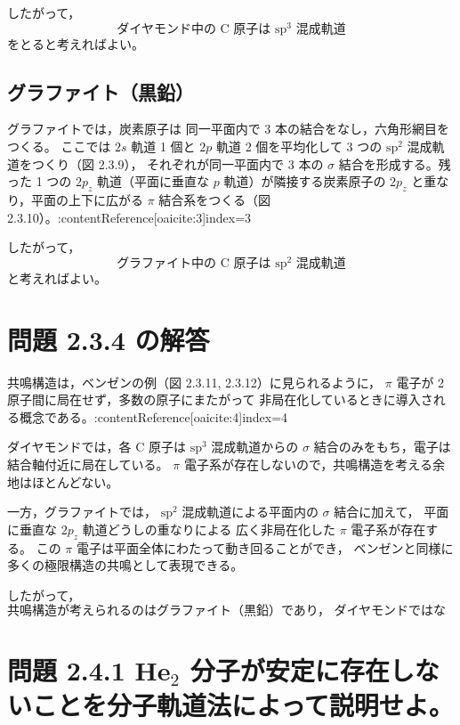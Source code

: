 \documentclass[a4paper,12pt]{jlreq}
\begin{document}
したがって，
\[
\boxed{\text{ダイヤモンド中の C 原子は \(\mathrm{sp^3}\) 混成軌道}}
\]
をとると考えればよい。

\subsection*{グラファイト（黒鉛）}

グラファイトでは，炭素原子は
同一平面内で 3 本の結合をなし，六角形網目をつくる。
ここでは \(2s\) 軌道 1 個と \(2p\) 軌道 2 個を平均化して
3 つの \(\mathrm{sp^2}\) 混成軌道をつくり（図 2.3.9），
それぞれが同一平面内で 3 本の \(\sigma\) 結合を形成する。残った
1 つの \(2p_z\) 軌道（平面に垂直な \(p\) 軌道）が隣接する炭素原子の
\(2p_z\) と重なり，平面の上下に広がる \(\pi\) 結合系をつくる（図 2.3.10）。:contentReference[oaicite:3]{index=3}

したがって，
\[
\boxed{\text{グラファイト中の C 原子は \(\mathrm{sp^2}\) 混成軌道}}
\]
と考えればよい。

\section*{問題 2.3.4 の解答}

共鳴構造は，ベンゼンの例（図 2.3.11, 2.3.12）に見られるように，
\(\pi\) 電子が 2 原子間に局在せず，多数の原子にまたがって
非局在化しているときに導入される概念である。:contentReference[oaicite:4]{index=4}

ダイヤモンドでは，各 C 原子は \(\mathrm{sp^3}\) 混成軌道からの
\(\sigma\) 結合のみをもち，電子は結合軸付近に局在している。
\(\pi\) 電子系が存在しないので，共鳴構造を考える余地はほとんどない。

一方，グラファイトでは，
\(\mathrm{sp^2}\) 混成軌道による平面内の \(\sigma\) 結合に加えて，
平面に垂直な \(2p_z\) 軌道どうしの重なりによる
広く非局在化した \(\pi\) 電子系が存在する。
この \(\pi\) 電子は平面全体にわたって動き回ることができ，
ベンゼンと同様に多くの極限構造の共鳴として表現できる。

したがって，
\[
\boxed{\text{共鳴構造が考えられるのはグラファイト（黒鉛）であり，
ダイヤモンドではない。}}
\]

\newpage


\section*{問題 2.4.1 He$_2$ 分子が安定に存在しないことを分子軌道法によって説明せよ。}
\end{document}
